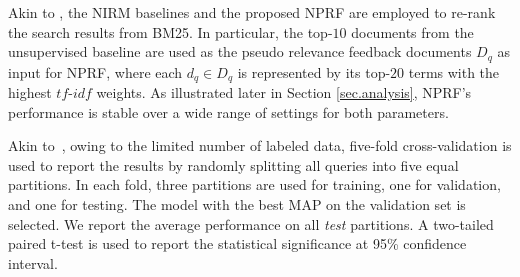 \documentclass[11pt,a4paper]{article}
\newcommand{\tf}{\ensuremath{\mathit{tf}}}
\begin{document}
Akin to \cite{DBLP:conf/cikm/GuoFAC16,DBLP:conf/sigir/XiongDCLP17,DBLP:conf/emnlp/HuiYBM17}, the NIRM baselines and the proposed NPRF are employed to re-rank the search results from BM25.
In particular,
the top-$10$ documents from the unsupervised baseline are used as the pseudo relevance feedback documents $D_q$ as input for NPRF,
where each $d_q \in D_q$ is represented by its top-$20$ terms with the highest \tf-$idf$ weights.
As illustrated later in Section \ref{sec.analysis}, NPRF's performance is stable over a wide range of settings for both parameters.


Akin to~\cite{DBLP:conf/wsdm/HuiYBM18},
owing to the limited number of 
labeled data,
five-fold cross-validation is used to report the results by randomly splitting all queries into five equal partitions.
In each fold,
three partitions are used for training, one for validation, and one for testing. The model with the best MAP on the validation set is selected.
We report the average performance on all \textit{test} partitions. A two-tailed paired t-test 
is used to report the statistical significance at 95\% confidence interval.
\end{document}
